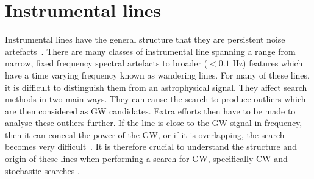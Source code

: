 \section{\label{detchar:lines}Instrumental lines}

%

Instrumental lines have the general structure that they are persistent noise
artefacts~.  There are many classes of
instrumental line spanning a range from narrow, fixed frequency spectral
artefacts to broader ($<0.1$ Hz) features which have a time varying frequency
known as wandering lines.  For many of these lines, it is difficult to
distinguish them from an astrophysical signal.  They affect search methods in
two main ways.  They can cause the search to produce outliers which are then
considered as \gls{GW} candidates.  Extra efforts then have to be made to
analyse these outliers further.  If the line is close to the \gls{GW} signal in
frequency, then it can conceal the power of the \gls{GW}, or if it is
overlapping, the search becomes very difficult~.  It is therefore crucial to
understand the structure and origin of these lines when performing a search for
\gls{GW}, specifically \gls{CW} and stochastic searches .~

%

